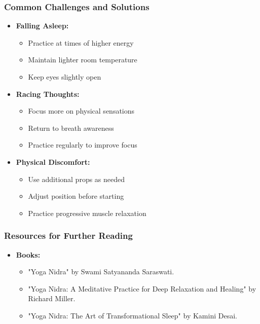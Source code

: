 \begin{frame}[fragile]\frametitle{Common Challenges and Solutions}
    \begin{itemize}
        \item \textbf{Falling Asleep:}
        \begin{itemize}
            \item Practice at times of higher energy
            \item Maintain lighter room temperature
            \item Keep eyes slightly open
        \end{itemize}
        \item \textbf{Racing Thoughts:}
        \begin{itemize}
            \item Focus more on physical sensations
            \item Return to breath awareness
            \item Practice regularly to improve focus
        \end{itemize}
        \item \textbf{Physical Discomfort:}
        \begin{itemize}
            \item Use additional props as needed
            \item Adjust position before starting
            \item Practice progressive muscle relaxation
        \end{itemize}
    \end{itemize}
\end{frame}

\begin{frame}[fragile]\frametitle{Resources for Further Reading}
    \begin{itemize}
        \item \textbf{Books:}
        \begin{itemize}
            \item "Yoga Nidra" by Swami Satyananda Saraswati.
            \item "Yoga Nidra: A Meditative Practice for Deep Relaxation and Healing" by Richard Miller.
            \item "Yoga Nidra: The Art of Transformational Sleep" by Kamini Desai.
        \end{itemize}
    \end{itemize}
\end{frame}